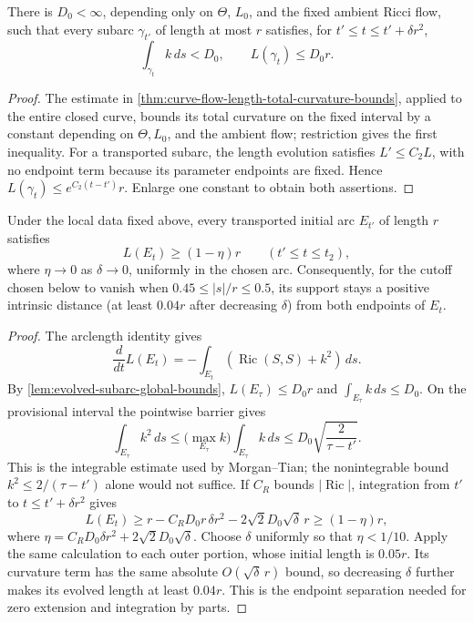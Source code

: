 \begin{theorem}
\label{lem:evolved-subarc-global-bounds}
\notready
There is $D_0<\infty$, depending only on $\Theta$, $L_0$, and the fixed
ambient Ricci flow, such that every subarc $\gamma_{t'}$ of length at most
$r$ satisfies, for $t'\le t\le t'+\delta r^2$,
\[
 \int_{\gamma_t}k\,ds<D_0,\qquad L(\gamma_t)\le D_0r.
\]
\end{theorem}
\begin{proof}
The estimate in \ref{thm:curve-flow-length-total-curvature-bounds}, applied
to the entire closed curve, bounds its total curvature on the fixed interval
by a constant depending on
$\Theta,L_0$, and the ambient flow; restriction gives the first inequality.
For a transported subarc, the length evolution satisfies
$L'\le C_2L$, with no endpoint term because its parameter endpoints are
fixed.  Hence $L(\gamma_t)\le e^{C_2(t-t')}r$.  Enlarge one constant to
obtain both assertions.
\end{proof}

\begin{lemma}
\label{lem:transported-endpoint-separation}
\notready
Under the local data fixed above, every transported initial arc $E_{t'}$ of
length $r$ satisfies
\[
 L(E_t)\ge(1-\eta)r\qquad(t'\le t\le t_2),
\]
where $\eta\to0$ as $\delta\to0$, uniformly in the chosen arc.  Consequently,
for the cutoff chosen below to vanish when $0.45\le|s|/r\le0.5$, its support
stays a positive intrinsic distance (at least $0.04r$ after decreasing
$\delta$) from both endpoints of $E_t$.
\end{lemma}
\begin{proof}
The arclength identity gives
\[
 \frac d{dt}L(E_t)=-\int_{E_t}(\operatorname{Ric}(S,S)+k^2)\,ds.
\]
By \ref{lem:evolved-subarc-global-bounds},
$L(E_\tau)\le D_0r$ and $\int_{E_\tau}k\,ds\le D_0$.  On the provisional
interval the pointwise barrier gives
\[
 \int_{E_\tau}k^2\,ds
 \le \bigl(\max_{E_\tau}k\bigr)\int_{E_\tau}k\,ds
 \le D_0\sqrt{\frac2{\tau-t'}}.
\]
This is the integrable estimate used by Morgan--Tian; the nonintegrable bound
$k^2\le2/(\tau-t')$ alone would not suffice.  If $C_R$ bounds
$|\operatorname{Ric}|$, integration from $t'$ to
$t\le t'+\delta r^2$ gives
\[
 L(E_t)\ge r-C_RD_0r\,\delta r^2
       -2\sqrt2D_0\sqrt\delta\,r
 \ge(1-\eta)r,
\]
where $\eta=C_RD_0\delta r^2+2\sqrt2D_0\sqrt\delta$.  Choose $\delta$
uniformly so that $\eta<1/10$.  Apply the same calculation to each outer
portion, whose initial length is $0.05r$.  Its curvature term has the same
absolute $O(\sqrt\delta\,r)$ bound, so decreasing $\delta$ further makes its
evolved length at least $0.04r$.  This is the endpoint separation
needed for zero extension and integration by parts.
\end{proof}

